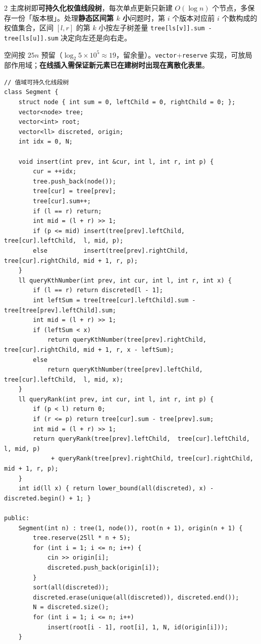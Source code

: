 \begin{multicols*}{2}
	主席树即\textbf{可持久化权值线段树}，每次单点更新只新建 $O(\log n)$ 个节点，多保存一份「版本根」。处理\textbf{静态区间第 $k$ 小}问题时，第 $i$ 个版本对应前 $i$ 个数构成的权值集合，区间 $[l, r]$ 的第 $k$ 小按左子树差量 \verb|tree[ls[v]].sum - tree[ls[u]].sum| 决定向左还是向右走。

	空间按 $25n$ 预留（$\log_2 5\!\times\!10^5 \approx 19$，留余量）。\verb|vector|+\verb|reserve| 实现，可放局部作用域；\textbf{在线插入需保证新元素已在建树时出现在离散化表里}。

	\begin{verbatim}
// 值域可持久化线段树
class Segment {
    struct node { int sum = 0, leftChild = 0, rightChild = 0; };
    vector<node> tree;
    vector<int> root;
    vector<ll> discreted, origin;
    int idx = 0, N;

    void insert(int prev, int &cur, int l, int r, int p) {
        cur = ++idx;
        tree.push_back(node());
        tree[cur] = tree[prev];
        tree[cur].sum++;
        if (l == r) return;
        int mid = (l + r) >> 1;
        if (p <= mid) insert(tree[prev].leftChild,  tree[cur].leftChild,  l, mid, p);
        else          insert(tree[prev].rightChild, tree[cur].rightChild, mid + 1, r, p);
    }
    ll queryKthNumber(int prev, int cur, int l, int r, int x) {
        if (l == r) return discreted[l - 1];
        int leftSum = tree[tree[cur].leftChild].sum - tree[tree[prev].leftChild].sum;
        int mid = (l + r) >> 1;
        if (leftSum < x)
            return queryKthNumber(tree[prev].rightChild, tree[cur].rightChild, mid + 1, r, x - leftSum);
        else
            return queryKthNumber(tree[prev].leftChild,  tree[cur].leftChild,  l, mid, x);
    }
    ll queryRank(int prev, int cur, int l, int r, int p) {
        if (p < l) return 0;
        if (r <= p) return tree[cur].sum - tree[prev].sum;
        int mid = (l + r) >> 1;
        return queryRank(tree[prev].leftChild,  tree[cur].leftChild,  l, mid, p)
             + queryRank(tree[prev].rightChild, tree[cur].rightChild, mid + 1, r, p);
    }
    int id(ll x) { return lower_bound(all(discreted), x) - discreted.begin() + 1; }

public:
    Segment(int n) : tree(1, node()), root(n + 1), origin(n + 1) {
        tree.reserve(25ll * n + 5);
        for (int i = 1; i <= n; i++) {
            cin >> origin[i];
            discreted.push_back(origin[i]);
        }
        sort(all(discreted));
        discreted.erase(unique(all(discreted)), discreted.end());
        N = discreted.size();
        for (int i = 1; i <= n; i++)
            insert(root[i - 1], root[i], 1, N, id(origin[i]));
    }


\end{verbatim}
\end{multicols*}

